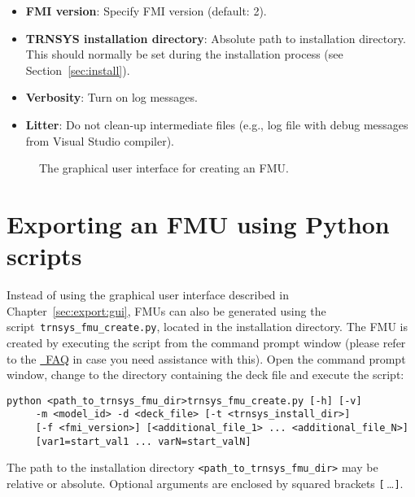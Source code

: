 \begin{enumerate}
\begin{itemize}
\begin{itemize}
    \end{itemize}
    \item \textbf{FMI version}: Specify FMI version (default: 2).
    \item \textbf{TRNSYS installation directory}: Absolute path to \trnsys installation directory. This should normally be set during the installation process (see Section~\ref{sec:install}).
    \item \textbf{Verbosity}: Turn on log messages.
    \item \textbf{Litter}: Do not clean-up intermediate files (e.g., log file with debug messages from Visual Studio compiler).
  \end{itemize}
\end{enumerate}

\begin{figure}[h]
\caption{The graphical user interface for creating an FMU.}
\label{fig:trnsys_fmu_create_gui}
\end{figure}

\clearpage

\section{Exporting an FMU using Python scripts}
\label{sec:export:command}

Instead of using the graphical user interface described in Chapter~\ref{sec:export:gui}, FMUs can also be generated using the \python script~\texttt{trnsys\_fmu\_create.py}, located in the installation directory.
The FMU is created by executing the script from the command prompt window (please refer to the \href{https://docs.python.org/2/faq/windows.html}{\python~FAQ} in case you need assistance with this).
Open the command prompt window, change to the directory containing the deck file and execute the script:
\begin{verbatim}
python <path_to_trnsys_fmu_dir>trnsys_fmu_create.py [-h] [-v] 
     -m <model_id> -d <deck_file> [-t <trnsys_install_dir>]
     [-f <fmi_version>] [<additional_file_1> ... <additional_file_N>]
     [var1=start_val1 ... varN=start_valN]
  \end{verbatim}
The path to the installation directory \verb!<path_to_trnsys_fmu_dir>! may be relative or absolute.
Optional arguments are enclosed by squared brackets \verb![!$\,$\ldots\verb!]!.


